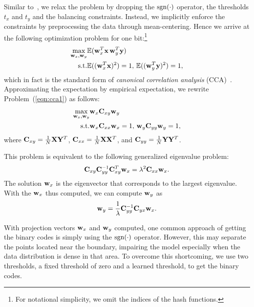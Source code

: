 Similar to~\cite{wang2010cvpr}, we relax the problem by dropping the $\mathop{\rm sgn}(\cdot)$ operator, the thresholds $ t_x $ and $ t_y $ and the balancing constraints.  Instead, we implicitly enforce the constraints by preprocessing the data through mean-centering.  Hence we arrive at the following optimization problem for one bit:\footnote{For notational simplicity, we omit the indices of the hash functions.}
\begin{eqnarray}
\label{eqn:cca1}
\max_{{\bf w}_{x},{\bf w}_{y}}& \mathbb{E}({\bf w}_{x}^{T}{\bf x} \, {\bf w}_{y}^{T}{\bf y})\\
\mathop{\rm s.t.}&  \mathbb{E}(({\bf w}_{x}^{T}{\bf x})^2)=1, \, \mathbb{E}(({\bf w}_{y}^{T}{\bf y})^2)=1,\nonumber
\end{eqnarray}
which in fact is the standard form of \emph{canonical correlation analysis} (\mbox{CCA})~\cite{hotelling1936cca}. Approximating the expectation by empirical expectation, we rewrite Problem~(\ref{eqn:cca1}) as follows:
\begin{eqnarray}
\label{eqn:csmh:optprob}
\max_{{\bf w}_{x},{\bf w}_{y}}& {\bf w}_{x}{\bf C}_{xy}{\bf w}_{y}\\
\mathop{\rm s.t.}&  {\bf w}_{x}{\bf C}_{xx}{\bf w}_{x}=1, \, {\bf w}_{y}{\bf C}_{yy}{\bf w}_{y}=1, \nonumber
\end{eqnarray}
where ${\bf C}_{xy} = \frac{1}{N}{\bf X}{\bf Y}^{T}$, ${\bf C}_{xx} = \frac{1}{N}{\bf X}{\bf X}^{T}$, and ${\bf C}_{yy} = \frac{1}{N}{\bf Y}{\bf Y}^{T}$.

This problem is equivalent to the following generalized eigenvalue problem:
\begin{align}
\label{eqn:csmh:wx}
{\bf C}_{xy}{\bf C}_{yy}^{-1}{\bf C}_{xy}^{T}{\bf w}_{x} = \lambda^2{\bf C}_{xx}{\bf w}_{x}.
\end{align}
The solution ${\bf w}_{x}$ is the eigenvector that corresponds to the largest eigenvalue.  With the ${\bf w}_{x}$ thus computed, we can compute ${\bf w}_{y}$ as
\begin{align}
\label{eqn:csmh:wy}
{\bf w}_{y} = \frac{1}{\lambda}{\bf C}_{yy}^{-1}{\bf C}_{yx}{\bf w}_{x}.
\end{align}

With projection vectors $ {\bf w}_x $ and $ {\bf w}_y $ computed, one common approach of getting the binary codes is simply using the $ \mathop{\rm sgn}(\cdot) $ operator. However, this may separate the points located near the boundary, impairing the model especially when the data distribution is dense in that area. To overcome this shortcoming, we use two thresholds, a fixed threshold of zero and a learned threshold, to get the binary codes.

